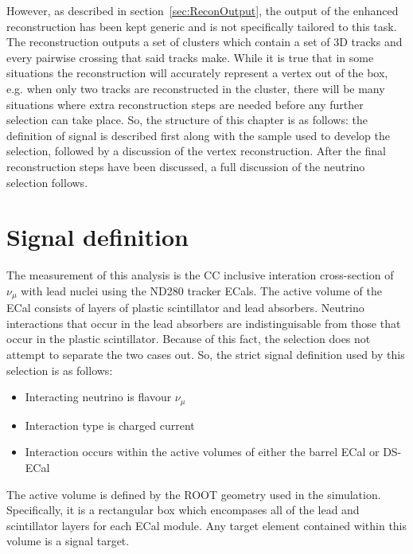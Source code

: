 However, as described in section~\ref{sec:ReconOutput}, the output of the enhanced reconstruction has been kept generic and is not specifically tailored to this task.  The reconstruction outputs a set of clusters which contain a set of 3D tracks and every pairwise crossing that said tracks make.  While it is true that in some situations the reconstruction will accurately represent a vertex out of the box, e.g. when only two tracks are reconstructed in the cluster, there will be many situations where extra reconstruction steps are needed before any further selection can take place.  So, the structure of this chapter is as follows: the definition of signal is described first along with the sample used to develop the selection, followed by a discussion of the vertex reconstruction.  After the final reconstruction steps have been discussed, a full discussion of the neutrino selection follows.

\section{Signal definition}
\label{sec:SignalDefinition}
The measurement of this analysis is the CC inclusive interation cross-section of $\nu_\mu$ with lead nuclei using the ND280 tracker ECals.  The active volume of the ECal consists of layers of plastic scintillator and lead absorbers.  Neutrino interactions that occur in the lead absorbers are indistinguisable from those that occur in the plastic scintillator.  Because of this fact, the selection does not attempt to separate the two cases out.  So, the strict signal definition used by this selection  is as follows:
\begin{itemize}
  \item Interacting neutrino is flavour $\nu_\mu$
  \item Interaction type is charged current
  \item Interaction occurs within the active volumes of either the barrel ECal or DS-ECal
\end{itemize}
The active volume is defined by the ROOT geometry used in the simulation.  Specifically, it is a rectangular box which encompases all of the lead and scintillator layers for each ECal module.  Any target element contained within this volume is a signal target.

